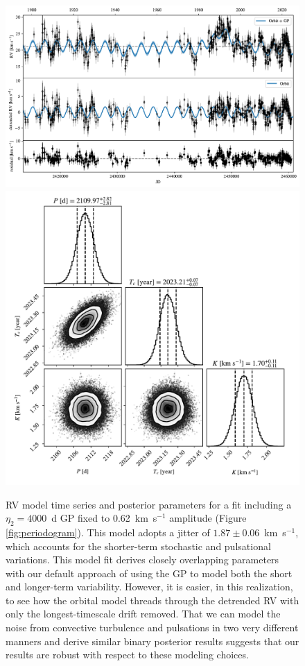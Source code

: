 \documentclass[twocolumn]{aastex631}
\begin{document}
\begin{figure}
    \centering
    \includegraphics[width=0.9\linewidth]{figures/RV_timeseries_model_jit.pdf}
    \includegraphics[width=0.55\linewidth]{figures/corner_mcmc_synth_jit.pdf}
    \caption{RV model time series and posterior parameters for a fit including a $\eta_2=4000$~d GP fixed to 0.62~km~s$^{-1}$ amplitude (Figure \ref{fig:periodogram}). This model adopts a jitter of $1.87\pm0.06$~km~s$^{-1}$, which accounts for the shorter-term stochastic and pulsational variations. This model fit derives closely overlapping parameters with our default approach of using the GP to model both the short and longer-term variability. However, it is easier, in this realization, to see how the orbital model threads through the detrended RV with only the longest-timescale drift removed. That we can model the noise from convective turbulence and pulsations in two very different manners and derive similar binary posterior results suggests that our results are robust with respect to these modeling choices. }
    \label{fig:RVjit}
\end{figure}
\end{document}
